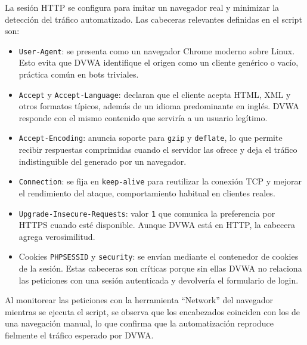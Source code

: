 \documentclass[letterpaper,12pt]{article}
\begin{document}
La sesión HTTP se configura para imitar un navegador real y minimizar la detección del tráfico automatizado. Las cabeceras relevantes definidas en el script son:
\begin{itemize}
    \item \verb|User-Agent|: se presenta como un navegador Chrome moderno sobre Linux. Esto evita que DVWA identifique el origen como un cliente genérico o vacío, práctica común en bots triviales.
    \item \verb|Accept| y \verb|Accept-Language|: declaran que el cliente acepta HTML, XML y otros formatos típicos, además de un idioma predominante en inglés. DVWA responde con el mismo contenido que serviría a un usuario legítimo.
    \item \verb|Accept-Encoding|: anuncia soporte para \verb|gzip| y \verb|deflate|, lo que permite recibir respuestas comprimidas cuando el servidor las ofrece y deja el tráfico indistinguible del generado por un navegador.
    \item \verb|Connection|: se fija en \verb|keep-alive| para reutilizar la conexión TCP y mejorar el rendimiento del ataque, comportamiento habitual en clientes reales.
    \item \verb|Upgrade-Insecure-Requests|: valor \verb|1| que comunica la preferencia por HTTPS cuando esté disponible. Aunque DVWA está en HTTP, la cabecera agrega verosimilitud.
    \item Cookies \verb|PHPSESSID| y \verb|security|: se envían mediante el contenedor de cookies de la sesión. Estas cabeceras son críticas porque sin ellas DVWA no relaciona las peticiones con una sesión autenticada y devolvería el formulario de login.
\end{itemize}

Al monitorear las peticiones con la herramienta ``Network'' del navegador mientras se ejecuta el script, se observa que los encabezados coinciden con los de una navegación manual, lo que confirma que la automatización reproduce fielmente el tráfico esperado por DVWA.
\end{document}
